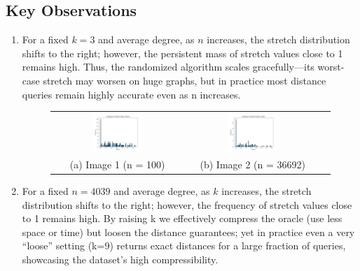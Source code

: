 \documentclass{article}
\begin{document}
\subsection*{Key Observations}

\begin{enumerate}
    \item For a fixed $k=3$ and average degree, as $n$ increases, the stretch distribution shifts to the right; however, the persistent mass of stretch values close to 1 remains high. Thus, the randomized algorithm scales gracefully—its worst-case stretch may worsen on huge graphs, but in practice most distance queries remain highly accurate even as n increases.

    \begin{figure}[H]
        \centering
        \begin{tabular}{ccc}
            \includegraphics[width=0.4\textwidth]{img/test16.png} &
            \includegraphics[width=0.4\textwidth]{img/test11.png} \\
            (a) Image 1 (n = 100) & (b) Image 2 (n = 36692)\\
        \end{tabular}
        \label{fig:three_images}
    \end{figure}

    \item For a fixed $n=4039$ and average degree, as $k$ increases, the stretch distribution shifts to the right; however, the frequency of stretch values close to 1 remains high. By raising k we effectively compress the oracle (use less space or time) but loosen the distance guarantees; yet in practice even a very “loose” setting (k=9) returns exact distances for a large fraction of queries, showcasing the dataset's high compressibility.


\end{enumerate}
\end{document}
